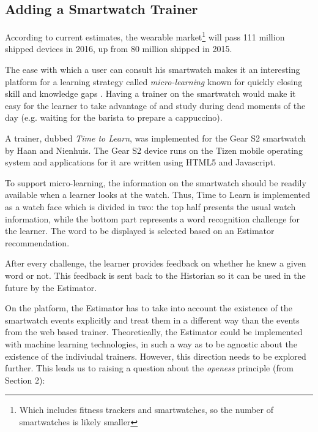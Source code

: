 

\subsection {Adding a Smartwatch Trainer}

According to current estimates, the wearable market\footnote{Which includes fitness trackers and smartwatches, so the number of smartwatches is likely smaller} will pass 111 million shipped devices in 2016, up from 80 million shipped in 2015. 

The ease with which a user can consult his smartwatch makes it an interesting platform for a learning strategy called {\em micro-learning} known for quickly closing skill and knowledge gaps  \cite{Dear12}. Having a trainer on the smartwatch would make it easy for the learner to take advantage of and study during dead moments of the day (e.g. waiting for the barista to prepare a cappuccino).

A trainer, dubbed {\em Time to Learn}, was implemented for the Gear S2 smartwatch by Haan and Nienhuis\cite{Nien16time}. The Gear S2 device runs on the Tizen mobile operating system and applications for it are written using HTML5 and Javascript.

To support micro-learning, the information on the smartwatch should be readily available when a learner looks at the watch. Thus, Time to Learn is implemented as a watch face which is divided in two: the top half presents the usual watch information, while the bottom part represents a word recognition challenge for the learner. The word to be displayed is selected based on an Estimator recommendation. 

After every challenge, the learner provides feedback on whether he knew a given word or not. This feedback is sent back to the Historian so it can be used in the future by the Estimator.


On the platform, the Estimator has to take into account the existence of the smartwatch events explicitly and treat them in a different way than the events from the web based trainer. 
Theoretically, the Estimator could be implemented with machine learning technologies, in such a way as to be agnostic about the existence of the indiviudal trainers. However, this direction needs to be explored further. This leads us to raising a question about the {\em openess} principle (from Section 2): 



